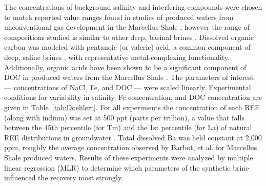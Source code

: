 The concentrations of background salinity and interfering compounds were chosen to match reported value ranges found in studies of produced waters from unconventional gas development in the Marcellus Shale \citep{Haluszczak_AG_2013, Barbot_EST_2013, Gregory_Elements_2011, Arvind_EST_2013, Vidic_Sci_2013},
however the range of compositions studied is similar to other deep, basinal brines \citep{Kharaka_REG_2000}.
Dissolved organic carbon was modeled with pentanoic (or valeric) acid, a common component of deep, saline brines \citep{Kharaka_REG_2000},
with representative metal-complexing functionality.
Additionally, organic acids have been shown to be a significant component of DOC in produced waters from the Marcellus Shale \citep{Wolford_PSU_2011}.
The parameters of interest --- concentrations of NaCl, Fe, and DOC --- were scaled linearly.
Experimental conditions for variability in salinity, Fe concentration, and DOC concentration are given in Table~\ref{tab:Doehlert}.
For all experiments the concentration of each REE (along with indium) was set at 500 ppt (parts per trillion), a value that falls between the 45th percentile (for Tm) and the 1st percentile (for La) of natural REE distributions in groundwater \citep{Noack_EST_2014}.
Total dissolved Ba was held constant at 2,000 ppm, roughly the average concentration observed by Barbot, et al. \citep{Barbot_EST_2013} for Marcellus Shale produced waters.
Results of these experiments were analyzed by multiple linear regression (MLR) to determine which parameters of the synthetic brine influenced the recovery most strongly.


